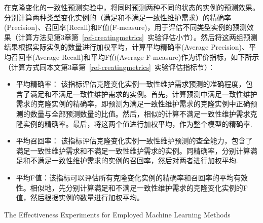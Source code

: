 在克隆变化的一致性预测实验中，将同时预测两种不同的状态的实例的预测效果。分别计算两种类型变化实例的（满足和不满足一致性维护需求）的精确率(Precision)、召回率(Recall)和F值(F-measure)，用于评估不同类型实例的预测效果（计算方法见第3章第~\ref{ref-creatingmetrics}~实验评估小节）。然后将这两组预测结果根据实际实例的数量进行加权平均，计算平均精确率(Average Precision)、平均召回率(Average Recall)和平均F值(Average F-measure)作为评价指标，如下所示（计算方式同本文第3章第~\ref{ref-creatingmetrics}~实验评估指标节）：

\begin{itemize}
\item
平均精确率： 该指标评估克隆变化实例一致性维护需求预测的准确程度，包含了满足和不满足一致性维护需求的实例。首先，计算预测中满足一致性维护需求的克隆实例的精确率，即预测为满足一致性维护需求的克隆实例中正确预测的数量与全部预测数量的比值。然后，相似的计算不满足一致性维护需求克隆实例的精确率。最后，将这两个值进行加权平均，作为整个模型的精确率.
\item
平均召回率： 该指标评估克隆变化实例一致性维护预测的查全能力，包含了满足一致性维护需求和不满足一致性维护需求的实例。同精确率，分别计算满足和不满足一致性维护需求的实例的召回率，然后对两者进行加权平均.
\item
平均F值：该指标可以评估所有克隆变化实例的精确率和召回率的平均有效性。相似地，先分别计算满足和不满足一致性维护需求的克隆变化实例的F值，然后根据实例的数量进行加权平均。
\end{itemize}

{The Effectiveness Experiments for Employed Machine Learning Methods}

